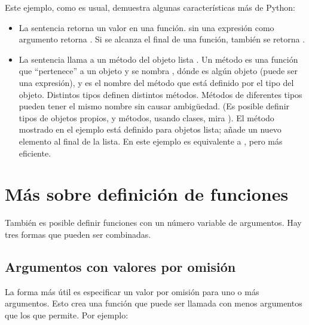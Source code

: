 \documentclass[a5paper,10pt,spanish]{sphinxmanual}
\begin{document}
\sphinxAtStartPar
Este ejemplo, como es usual, demuestra algunas características más de Python:
\begin{itemize}
\item {} 
\sphinxAtStartPar
La sentencia  retorna un valor en una función.  sin una expresión como argumento retorna . Si se alcanza el final de una función, también se retorna .

\item {} 
\sphinxAtStartPar
La sentencia  llama a un método del objeto lista . Un método es una función que “pertenece” a un objeto y se nombra , dónde  es algún objeto (puede ser una expresión), y  es el nombre del método que está definido por el tipo del objeto. Distintos tipos definen distintos métodos. Métodos de diferentes tipos pueden tener el mismo nombre sin causar ambigüedad. (Es posible definir tipos de objetos propios, y métodos, usando clases, mira {\hyperref[\detokenize{tutorial/classes:tut-classes}]{}}). El método  mostrado en el ejemplo está definido para objetos lista; añade un nuevo elemento al final de la lista. En este ejemplo es equivalente a , pero más eficiente.

\end{itemize}


\section{Más sobre definición de funciones}
\label{\detokenize{tutorial/controlflow:more-on-defining-functions}}\label{\detokenize{tutorial/controlflow:tut-defining}}
\sphinxAtStartPar
También es posible definir funciones con un número variable de argumentos. Hay tres formas que pueden ser combinadas.


\subsection{Argumentos con valores por omisión}
\label{\detokenize{tutorial/controlflow:default-argument-values}}\label{\detokenize{tutorial/controlflow:tut-defaultargs}}
\sphinxAtStartPar
La forma más útil es especificar un valor por omisión para uno o más argumentos. Esto crea una función que puede ser llamada con menos argumentos que los que permite. Por ejemplo:
\end{document}
